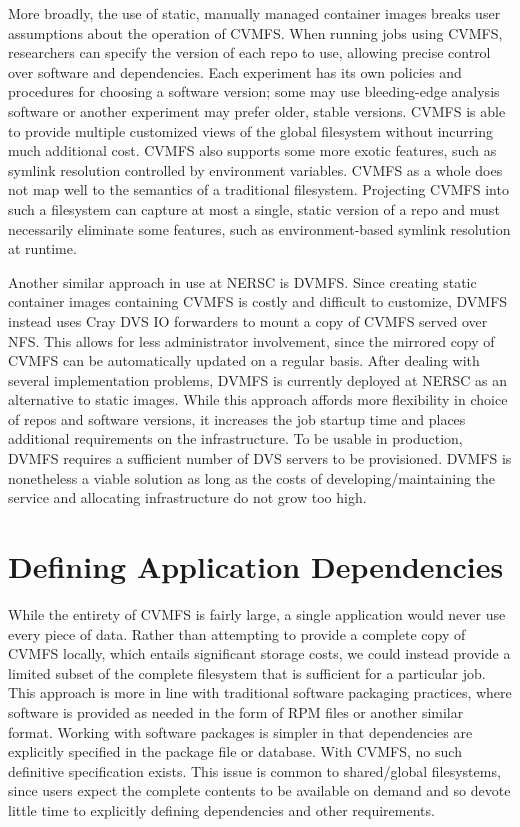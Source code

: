 \documentclass[sigconf]{acmart}
\begin{document}
More broadly, the use of static, manually managed container images breaks user assumptions about the operation of CVMFS.
When running jobs using CVMFS,
researchers can specify the version of each repo to use,
allowing precise control over software and dependencies.
Each experiment has its own policies and procedures for choosing a software version;
some may use bleeding-edge analysis software or another experiment may prefer older, stable versions.
CVMFS is able to provide multiple customized views of the global filesystem without incurring much additional cost.
CVMFS also supports some more exotic features,
such as symlink resolution controlled by environment variables.
CVMFS as a whole does not map well to the semantics of a traditional filesystem.
Projecting CVMFS into such a filesystem can capture at most a single, static version of a repo and must necessarily eliminate some features,
such as environment-based symlink resolution at runtime.

Another similar approach in use at NERSC is DVMFS.
Since creating static container images containing CVMFS is costly and difficult to customize,
DVMFS instead uses Cray DVS IO forwarders to mount a copy of CVMFS served over NFS.
This allows for less administrator involvement,
since the mirrored copy of CVMFS can be automatically updated on a regular basis.
After dealing with several implementation problems,
DVMFS is currently deployed at NERSC as an alternative to static images.
While this approach affords more flexibility in choice of repos and software versions,
it increases the job startup time and places additional requirements on the infrastructure.
To be usable in production, DVMFS requires a sufficient number of DVS servers to be provisioned.
DVMFS is nonetheless a viable solution as long as the costs of developing/maintaining the service and allocating infrastructure do not grow too high.
\fi

\section{Defining Application Dependencies}

While the entirety of CVMFS is fairly large,
a single application would never use every piece of data.
Rather than attempting to provide a complete copy of CVMFS locally,
which entails significant storage costs,
we could instead provide a limited subset of the complete filesystem that is sufficient for a particular job.
This approach is more in line with traditional software packaging practices,
where software is provided as needed in the form of RPM files or another similar format.
Working with software packages is simpler in that dependencies are explicitly specified in the package file or database.
With CVMFS, no such definitive specification exists.
This issue is common to shared/global filesystems,
since users expect the complete contents to be available on demand and so devote little time to explicitly defining dependencies and other requirements.
\end{document}
